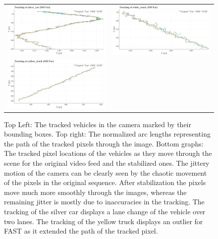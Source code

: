 \begin{figure}[!ht]
\begin{tabular}{cc}
    \includegraphics[width=0.475\linewidth]{diagrams/object_tracking/s50_s_far/silver_car.png}    &  
    \includegraphics[width=0.475\linewidth]{diagrams/object_tracking/s50_s_far/white_truck.png}    \\  
    \includegraphics[width=0.475\linewidth]{diagrams/object_tracking/s50_s_far/yellow_truck.png}   
  \end{tabular}
  \caption{Top Left:
  The tracked vehicles in the camera  marked by their bounding boxes. 
  Top right: 
  The normalized arc lengths representing the path of the tracked pixels through the image.
  Bottom graphs:
  The tracked pixel locations of the vehicles as they move through the scene for the original video feed and the stabilized ones.
  The jittery motion of the camera can be clearly seen by the chaotic movement of the pixels in the original sequence.
  After stabilization the pixels move much more smoothly through the images, whereas the remaining jitter is mostly due to inaccuracies in the tracking. 
  The tracking of the silver car displays a lane change of the vehicle over two lanes.
  The tracking of the yellow truck displays an outlier for FAST as it extended the path of the tracked pixel.
  }
  \label{fig:object_tracking_appendix_s50_s_far}
\end{figure}

